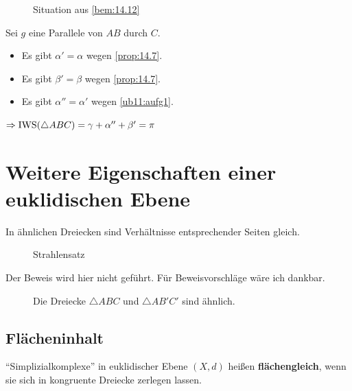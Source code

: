 \begin{figure}[htp]
    \centering
    
    \caption{Situation aus \cref{bem:14.12}}
    \label{fig:14.12}
\end{figure}

\begin{beweis}
    Sei $g$ eine Parallele von $AB$ durch $C$. 

    \begin{itemize}
        \item Es gibt $\alpha' = \alpha$ wegen \cref{prop:14.7}.
        \item Es gibt $\beta' = \beta$ wegen \cref{prop:14.7}.
        \item Es gibt $\alpha'' = \alpha'$ wegen \cref{ub11:aufg1}.
    \end{itemize}
    $\Rightarrow \operatorname{IWS}(\triangle ABC) = \gamma + \alpha'' + \beta' = \pi$
\end{beweis}

\section{Weitere Eigenschaften einer euklidischen Ebene}
\begin{satz}[Strahlensatz]
    In ähnlichen Dreiecken sind Verhältnisse entsprechender Seiten gleich.
\end{satz}

\begin{figure}[htp]
    \centering
    
    \caption{Strahlensatz}
    \label{fig:bild-2}
\end{figure}

Der Beweis wird hier nicht geführt. Für Beweisvorschläge wäre ich 
dankbar.

\begin{figure}[htp]
    \centering
    
    \caption{Die Dreiecke $\triangle ABC$ und $\triangle AB'C'$ sind ähnlich.}
    \label{fig:bild-3}
\end{figure}

\subsection{Flächeninhalt}
\begin{definition}%
    \enquote{Simplizialkomplexe} in euklidischer Ebene $(X,d)$ heißen
    \textbf{flächengleich},
    wenn sie sich in kongruente Dreiecke zerlegen lassen.
\end{definition}

